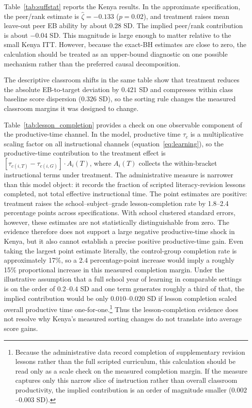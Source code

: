 \documentclass[11pt]{article}
\begin{document}
Table~\ref{tab:suffstat} reports the Kenya results. In the approximate specification, the peer/rank estimate is $\hat{\zeta} = -0.133$ ($p = 0.02$), and treatment raises mean leave-out peer EB ability by about $0.28$ SD\@. The implied peer/rank contribution is about $-0.04$ SD\@. This magnitude is large enough to matter relative to the small Kenya ITT\@. However, because the exact\mbox{-}BH estimates are close to zero, the calculation should be treated as an upper-bound diagnostic on one possible mechanism rather than the preferred causal decomposition.

The descriptive classroom shifts in the same table show that treatment reduces the absolute EB-to-target deviation by $0.421$ SD and compresses within class baseline score dispersion ($0.326$ SD), so the sorting rule changes the measured classroom margins it was designed to change.

Table~\ref{tab:lesson_completion} provides a check on one observable component of the productive-time channel. In the model, productive time $\tau_c$ is a multiplicative scaling factor on all instructional channels (equation~\ref{eq:learning}), so the productive-time contribution to the treatment effect is $[\tau_{c(i,T)} - \tau_{c(i,G)}] \cdot A_i(T)$, where $A_i(T)$ collects the within-bracket instructional terms under treatment. The administrative measure is narrower than this model object: it records the fraction of scripted literacy-revision lessons completed, not total effective instructional time. The point estimates are positive: treatment raises the school--subject--grade lesson-completion rate by 1.8--2.4 percentage points across specifications. With school clustered standard errors, however, these estimates are not statistically distinguishable from zero. The evidence therefore does not support a large negative productive-time shock in Kenya, but it also cannot establish a precise positive productive-time gain. Even taking the largest point estimate literally, the control\mbox{-}group completion rate is approximately 17\%, so a 2.4 percentage-point increase would imply a roughly 15\% proportional increase in this measured completion margin. Under the illustrative assumption that a full school year of learning in comparable settings is on the order of $0.2$--$0.4$ SD \citep[e.g.,][]{muralidharan2019disrupting} and one term generates roughly a third of that, the implied contribution would be only $0.010$--$0.020$ SD if lesson completion scaled overall productive time one-for-one.\footnote{Because the administrative data record completion of supplementary revision lessons rather than the full scripted curriculum, this calculation should be read only as a scale check on the measured completion margin. If the measure captures only this narrow slice of instruction rather than overall classroom productivity, the implied contribution is an order of magnitude smaller ($0.002$--$0.003$ SD).} Thus the lesson-completion evidence does not resolve why Kenya's measured sorting changes do not translate into average score gains.
\end{document}
